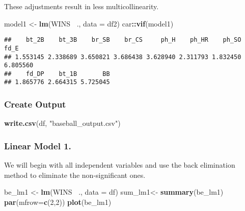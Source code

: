 \documentclass[]{article}
\newenvironment{Shaded}{\begin{snugshade}}{\end{snugshade}}
\newcommand{\DataTypeTok}[1]{\textcolor[rgb]{0.13,0.29,0.53}{#1}}
\newcommand{\DecValTok}[1]{\textcolor[rgb]{0.00,0.00,0.81}{#1}}
\newcommand{\KeywordTok}[1]{\textcolor[rgb]{0.13,0.29,0.53}{\textbf{#1}}}
\newcommand{\NormalTok}[1]{#1}
\newcommand{\OperatorTok}[1]{\textcolor[rgb]{0.81,0.36,0.00}{\textbf{#1}}}
\newcommand{\StringTok}[1]{\textcolor[rgb]{0.31,0.60,0.02}{#1}}
\begin{document}
These adjustments result in less multicollinearity.

\begin{Shaded}
\begin{Highlighting}[]
\NormalTok{model1 <-}\StringTok{ }\KeywordTok{lm}\NormalTok{(WINS }\OperatorTok{~}\NormalTok{., }\DataTypeTok{data =}\NormalTok{ df2)}
\NormalTok{car}\OperatorTok{::}\KeywordTok{vif}\NormalTok{(model1)}
\end{Highlighting}
\end{Shaded}

\begin{verbatim}
##    bt_2B    bt_3B    br_SB    br_CS     ph_H    ph_HR    ph_SO     fd_E 
## 1.553145 2.338689 3.650821 3.686438 3.628940 2.311793 1.832450 6.805560 
##    fd_DP    bt_1B       BB 
## 1.865776 2.664315 5.725045
\end{verbatim}

\hypertarget{create-output}{%
\subsubsection{Create Output}\label{create-output}}

\begin{Shaded}
\begin{Highlighting}[]
\KeywordTok{write.csv}\NormalTok{(df, }\StringTok{"baseball_output.csv"}\NormalTok{)}
\end{Highlighting}
\end{Shaded}

\hypertarget{linear-model-1.}{%
\subsubsection{Linear Model 1.}\label{linear-model-1.}}

We will begin with all independent variables and use the back
elimination method to eliminate the non-significant ones.

\begin{Shaded}
\begin{Highlighting}[]
\NormalTok{be_lm1 <-}\StringTok{ }\KeywordTok{lm}\NormalTok{(WINS }\OperatorTok{~}\NormalTok{., }\DataTypeTok{data =}\NormalTok{ df)}
\NormalTok{sum_lm1<-}\StringTok{ }\KeywordTok{summary}\NormalTok{(be_lm1)}
\KeywordTok{par}\NormalTok{(}\DataTypeTok{mfrow=}\KeywordTok{c}\NormalTok{(}\DecValTok{2}\NormalTok{,}\DecValTok{2}\NormalTok{))}
\KeywordTok{plot}\NormalTok{(be_lm1)}
\end{Highlighting}
\end{Shaded}
\end{document}
